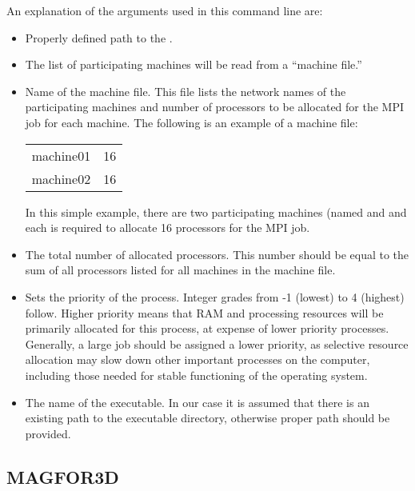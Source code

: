 An explanation of the arguments used in this command line are:
\begin{itemize}
\item[\codeName{PATH}] Properly defined path to the .
\item[\codeName{-machinefile}] The list of participating machines will be read from a ``machine file.''
\item[\codeName{machine.txt}] Name of the machine file. This file lists the network names of the participating machines and number of processors to be allocated for the MPI job for each machine. The following is an example of a machine file:

\begin{fileExample}
\begin{tabular}{|lc|}
\hline
machine01 & 16 \\
machine02 & 16 \\
\hline
\end{tabular}
\end{fileExample}

In this simple example, there are two participating machines (named  and  and each is required to allocate 16 processors for the MPI job.

\item[\codeName{nproc}] The total number of allocated processors. This number should be equal to the sum of all processors listed for all machines in the machine file.
\item[\codeName{-priority 0}] Sets the priority of the process. Integer grades from -1 (lowest) to 4 (highest) follow. Higher priority means that RAM and processing resources will be primarily allocated for this process, at expense of lower priority processes. Generally, a large job should be assigned a lower priority, as selective resource allocation may slow down other important processes on the computer, including those needed for stable functioning of the operating system.
\item[\codeName{maginv3d.exe}] The name of the executable. In our case it is assumed that there is an existing path to the executable directory, otherwise proper path should be provided.
\end{itemize}

\subsection{MAGFOR3D}

